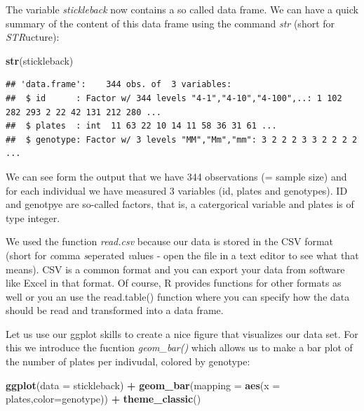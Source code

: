 \documentclass[]{article}
\newenvironment{Shaded}{\begin{snugshade}}{\end{snugshade}}
\newcommand{\DataTypeTok}[1]{\textcolor[rgb]{0.13,0.29,0.53}{#1}}
\newcommand{\KeywordTok}[1]{\textcolor[rgb]{0.13,0.29,0.53}{\textbf{#1}}}
\newcommand{\NormalTok}[1]{#1}
\newcommand{\OperatorTok}[1]{\textcolor[rgb]{0.81,0.36,0.00}{\textbf{#1}}}
\newcommand{\StringTok}[1]{\textcolor[rgb]{0.31,0.60,0.02}{#1}}
\begin{document}
The variable \emph{stickleback} now contains a so called data frame. We
can have a quick summary of the content of this data frame using the
command \emph{str} (short for \emph{STR}ucture):

\begin{Shaded}
\begin{Highlighting}[]
\KeywordTok{str}\NormalTok{(stickleback)}
\end{Highlighting}
\end{Shaded}

\begin{verbatim}
## 'data.frame':    344 obs. of  3 variables:
##  $ id      : Factor w/ 344 levels "4-1","4-10","4-100",..: 1 102 282 293 2 22 42 131 212 280 ...
##  $ plates  : int  11 63 22 10 14 11 58 36 31 61 ...
##  $ genotype: Factor w/ 3 levels "MM","Mm","mm": 3 2 2 2 3 3 2 2 2 2 ...
\end{verbatim}

We can see form the output that we have 344 observations (= sample size)
and for each individual we have measured 3 variables (id, plates and
genotypes). ID and genotpye are so-called factors, that is, a
catergorical variable and plates is of type integer.

We used the function \emph{read.csv} because our data is stored in the
CSV format (short for \emph{c}omma \emph{s}eperated \emph{v}alues - open
the file in a text editor to see what that means). CSV is a common
format and you can export your data from software like Excel in that
format. Of course, R provides functions for other formats as well or you
an use the read.table() function where you can specify how the data
should be read and transformed into a data frame.

Let us use our ggplot skills to create a nice figure that visualizes our
data set. For this we introduce the fucntion \emph{geom\_bar()} which
allows us to make a bar plot of the number of plates per indivudal,
colored by genotype:

\begin{Shaded}
\begin{Highlighting}[]
\KeywordTok{ggplot}\NormalTok{(}\DataTypeTok{data =}\NormalTok{ stickleback) }\OperatorTok{+}\StringTok{ }
\StringTok{  }\KeywordTok{geom_bar}\NormalTok{(}\DataTypeTok{mapping =} \KeywordTok{aes}\NormalTok{(}\DataTypeTok{x =}\NormalTok{ plates,}\DataTypeTok{color=}\NormalTok{genotype)) }\OperatorTok{+}\StringTok{ }
\StringTok{  }\KeywordTok{theme_classic}\NormalTok{()}
\end{Highlighting}
\end{Shaded}
\end{document}
